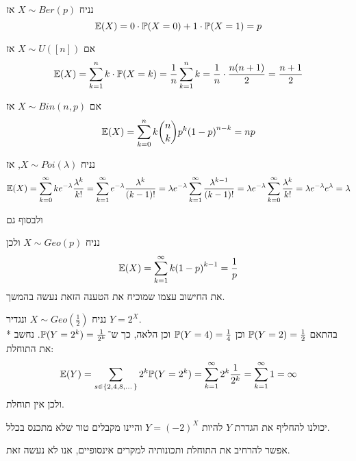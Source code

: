 \begin{example}
	נניח $X \sim Ber(p)$ אז
	\[
		\mathbb{E}(X) = 0 \cdot \mathbb{P}(X = 0) + 1 \cdot \mathbb{P}(X = 1) = p
	\]
\end{example}
\begin{example}
	אם $X \sim U([n])$ אז
	\[
		\mathbb{E}(X) = \sum_{k = 1}^n k \cdot \mathbb{P}(X = k)
		= \frac{1}{n} \sum_{k = 1}^{n} k
		= \frac{1}{n} \cdot \frac{n(n + 1)}{2}
		= \frac{n + 1}{2}
	\]
\end{example}
\begin{example}
	אם $X \sim Bin(n, p)$ אז
	\[
		\mathbb{E}(X)
		= \sum_{k = 0}^{n} k \binom{n}{k} p^k {(1 - p)}^{n - k}
		= np
	\]
\end{example}
\begin{example}
	נניח $X \sim Poi(\lambda)$, אז
	\[
		\mathbb{E}(X)
		= \sum_{k = 0}^\infty k e^{-\lambda} \frac{\lambda^k}{k!}
		= \sum_{k = 1}^\infty e^{-\lambda} \frac{\lambda^k}{(k - 1)!}
		= \lambda e^{-\lambda} \sum_{k = 1}^\infty \frac{\lambda^{k - 1}}{(k - 1)!}
		= \lambda e^{-\lambda} \sum_{k = 0}^\infty \frac{\lambda^k}{k!}
		= \lambda e^{-\lambda} e^\lambda
		= \lambda
	\]
\end{example}
ולבסוף גם
\begin{example}
	נניח $X \sim Geo(p)$ ולכן
	\[
		\mathbb{E}(X)
		= \sum_{k = 1}^{\infty} k {(1 - p)}^{k - 1}
		= \frac{1}{p}
	\]
	את החישוב עצמו שמוכיח את הטענה הזאת נעשה בהמשך.
\end{example}
\begin{example}
	נניח $X \sim Geo(\frac{1}{2})$ ונגדיר $Y = 2^X$. \\*
	בהתאם $\mathbb{P}(Y = 2) = \frac{1}{2}$ וכן $\mathbb{P}(Y = 4) = \frac{1}{4}$ וכן הלאה, כך ש־$\mathbb{P}(Y = 2^k) = \frac{1}{2^k}$.
	נחשב את התוחלת:
	\[
		\mathbb{E}(Y)
		= \sum_{s \in \{2, 4, 8, \dots\}} 2^k \mathbb{P}(Y = 2^k)
		= \sum_{k = 1}^{\infty} 2^k \frac{1}{2^k}
		= \sum_{k = 1}^{\infty} 1
		= \infty
	\]
	ולכן אין תוחלת.

	יכולנו להחליף את הגדרת $Y$ להיות $Y = {(-2)}^X$ והיינו מקבלים טור שלא מתכנס בכלל.
\end{example}
\begin{remark}
	אפשר להרחיב את התוחלת ותכונותיה למקרים אינסופיים, אנו לא נעשה זאת.
\end{remark}

